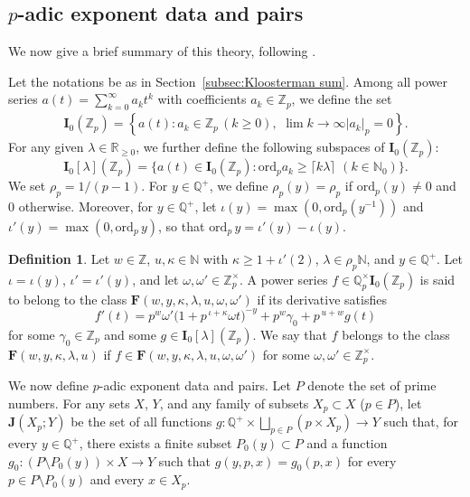 \documentclass[11pt,reqno]{amsart}
\numberwithin{equation}{section}
\theoremstyle{plain}
\theoremstyle{definition}
\newtheorem{definition}[lemma]{Definition}
\newcommand{\ord}{\mathrm{ord}}
\begin{document}
\subsection{$p$-adic exponent data and pairs}
We now give a brief summary of this theory, following \cite[Sections 2\,\&\,3]{MD}.

Let the notations be as in Section~\ref{subsec:Kloosterman sum}.  Among all power series $a(t)=\sum_{k=0}^{\infty}a_kt^k$ with 
coefficients $a_k\in\mathbb{Z}_p$, we define the set
\begin{align*}
\mathbf{I}_0(\mathbb{Z}_p)=\left\{a(t):a_k\in\mathbb{Z}_p
\,(k\geqslant 0),\,\,\lim{k\rightarrow\infty} |a_k|_p=0\right\}.
\end{align*}
For any given $\lambda\in\mathbb{R}_{\geqslant 0}$, we further define the following subspaces of $\mathbf{I}_0(\mathbb{Z}_p)$:
\begin{equation*}
\mathbf{I}_0[\lambda](\mathbb{Z}_p)=\{a(t)\in\mathbf{I}_0(\mathbb{Z}_p):\text{ord}_pa_k\geqslant\lceil k\lambda\rceil\,\,(k\in\mathbb{N}_0)\}.
\end{equation*}
We set $\rho_p = 1/(p-1)$. For $y\in\mathbb{Q}^{+}$, 
we define $\rho_p(y) = \rho_p$ if $\ord_p(y) \neq 0$ and $0$ otherwise.
Moreover, for $y\in\mathbb{Q}^{+}$, let $\iota(y)=\max(0, \text{ord}_p(y^{-1}))$ and $\iota'(y)=\max(0, \text{ord}_p\,y)$, so that $\text{ord}_p\,y=\iota'(y)-\iota(y)$.
\begin{definition}\label{Definition}
Let $w \in \mathbb{Z}$, $u, \kappa \in \mathbb{N}$ with $\kappa \geq 1 + \iota'(2)$, $\lambda \in \rho_p \mathbb{N}$, and $y \in \mathbb{Q}^+$. Let $\iota = \iota(y)$, $\iota' = \iota'(y)$, and let $\omega, \omega' \in \mathbb{Z}_p^\times$. A power series $f \in \mathbb{Q}_p^\times \mathbf{I}_0(\mathbb{Z}_p)$ is said to belong to the class $\mathbf{F}(w, y, \kappa, \lambda, u, \omega, \omega')$ if its derivative satisfies
\begin{equation}
\label{ClassFDefinition}
f'(t) = p^w \omega' \big( 1 + p^{\,\iota + \kappa} \omega t \big)^{-y} + p^w \gamma_0 + p^{\,u + w} g(t)
\end{equation}
for some $\gamma_0 \in \mathbb{Z}_p$ and some $g \in \mathbf{I}_0[\lambda](\mathbb{Z}_p)$.
We say that $f$ belongs to the class $\mathbf{F}(w, y, \kappa, \lambda, u)$ if $f \in \mathbf{F}(w, y, \kappa, \lambda, u, \omega, \omega')$ for some $\omega, \omega' \in \mathbb{Z}_p^\times$.
\end{definition}

We now define $p$-adic exponent data and pairs. Let $P$ denote the set of prime numbers. For any sets $X$, $Y$, and any family of subsets $X_p \subset X$ ($p \in P$), let $\mathbf{J}(X_p;Y)$ be the set of all functions $g : \mathbb{Q}^{+} \times \bigsqcup_{p \in P} ({p} \times X_p) \to Y$ such that, for every $y \in \mathbb{Q}^{+}$, there exists a finite subset $P_0(y) \subset P$ and a function $g_0 : (P \setminus P_0(y)) \times X \to Y$ such that $g(y,p,x) = g_0(p,x)$ for every $p \in P \setminus P_0(y)$ and every $x \in X_p$.
\end{document}
